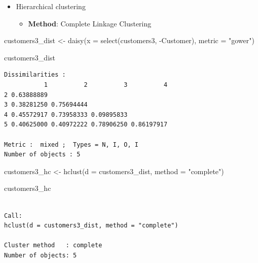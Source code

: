 \documentclass[
  ignorenonframetext,
]{beamer}
\newenvironment{Shaded}{\begin{snugshade}}{\end{snugshade}}
\newcommand{\AttributeTok}[1]{\textcolor[rgb]{0.40,0.45,0.13}{#1}}
\newcommand{\FunctionTok}[1]{\textcolor[rgb]{0.28,0.35,0.67}{#1}}
\newcommand{\NormalTok}[1]{\textcolor[rgb]{0.00,0.23,0.31}{#1}}
\newcommand{\OtherTok}[1]{\textcolor[rgb]{0.00,0.23,0.31}{#1}}
\newcommand{\SpecialCharTok}[1]{\textcolor[rgb]{0.37,0.37,0.37}{#1}}
\newcommand{\StringTok}[1]{\textcolor[rgb]{0.13,0.47,0.30}{#1}}
\providecommand{\tightlist}{%
  \setlength{\itemsep}{0pt}\setlength{\parskip}{0pt}}\usepackage{longtable,booktabs,array}
\begin{document}
\begin{frame}[fragile]{}
\label{section-21}
\begin{itemize}
\item
  Hierarchical clustering

  \begin{itemize}
  \tightlist
  \item
    \textbf{Method}: Complete Linkage Clustering
  \end{itemize}
\end{itemize}

\tiny

\begin{Shaded}
\begin{Highlighting}[]
\NormalTok{customers3\_dist }\OtherTok{\textless{}{-}} \FunctionTok{daisy}\NormalTok{(}\AttributeTok{x =} \FunctionTok{select}\NormalTok{(customers3, }\SpecialCharTok{{-}}\NormalTok{Customer),}
                        \AttributeTok{metric =} \StringTok{"gower"}\NormalTok{)}

\NormalTok{customers3\_dist}
\end{Highlighting}
\end{Shaded}

\begin{verbatim}
Dissimilarities :
           1          2          3          4
2 0.63888889                                 
3 0.38281250 0.75694444                      
4 0.45572917 0.73958333 0.09895833           
5 0.40625000 0.40972222 0.78906250 0.86197917

Metric :  mixed ;  Types = N, I, O, I 
Number of objects : 5
\end{verbatim}

\begin{Shaded}
\begin{Highlighting}[]
\NormalTok{customers3\_hc }\OtherTok{\textless{}{-}} \FunctionTok{hclust}\NormalTok{(}\AttributeTok{d =}\NormalTok{ customers3\_dist, }
                        \AttributeTok{method =} \StringTok{"complete"}\NormalTok{)}

\NormalTok{customers3\_hc}
\end{Highlighting}
\end{Shaded}

\begin{verbatim}

Call:
hclust(d = customers3_dist, method = "complete")

Cluster method   : complete 
Number of objects: 5 
\end{verbatim}
\end{frame}
\end{document}
